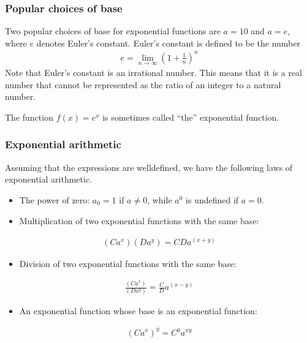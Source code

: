 \documentclass[letterpaper,10pt,english]{jupyterBook}
\begin{document}
\subsubsection{Popular choices of base}
\label{\detokenize{03.mappings_functions_correspondences:popular-choices-of-base}}
\sphinxAtStartPar
Two popular choices of base for exponential functions are \(a = 10\) and \(a = e\), where \(e\) denotes Euler’s constant. Euler’s constant is defined to be the number
\begin{equation*}
\begin{split}
e = \lim_{n \rightarrow \infty} \left(1 + \frac{1}{n} \right)^n
\end{split}
\end{equation*}
\sphinxAtStartPar
Note that Euler’s constant is an irrational number. This means that it is a real number that cannot be represented as the ratio of an integer to a natural number.

\sphinxAtStartPar
The function \(f(x) = e^x\) is sometimes called “the” exponential function.


\subsubsection{Exponential arithmetic}
\label{\detokenize{03.mappings_functions_correspondences:exponential-arithmetic}}
\sphinxAtStartPar
Assuming that the expressions are well\sphinxhyphen{}defined, we have the following laws of exponential arithmetic.
\begin{itemize}
\item {} 
\sphinxAtStartPar
The power of zero: \(a_0 = 1\) if \(a \ne 0\), while \(a^0\) is undefined if \(a = 0\).

\item {} 
\sphinxAtStartPar
Multiplication of two exponential functions with the same base:

\end{itemize}
\begin{equation*}
\begin{split}
(Ca^x)(Da^y) = CD a^{(x + y)}
\end{split}
\end{equation*}\begin{itemize}
\item {} 
\sphinxAtStartPar
Division of two exponential functions with the same base:

\end{itemize}
\begin{equation*}
\begin{split}
\frac{(Ca^x)}{(Da^y)} = \frac{C}{D} a^{(x - y)}
\end{split}
\end{equation*}\begin{itemize}
\item {} 
\sphinxAtStartPar
An exponential function whose base is an exponential function:

\end{itemize}
\begin{equation*}
\begin{split}
(Ca^x)^y = C^y a^{xy}
\end{split}
\end{equation*}
\end{document}
